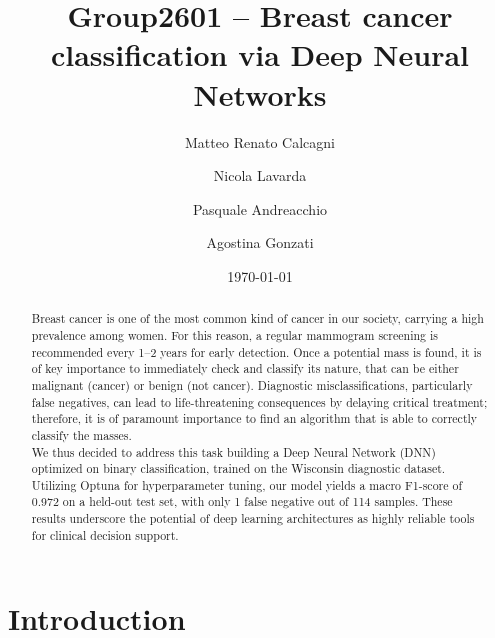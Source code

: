 \documentclass[prl,twocolumn]{revtex4-2}
\begin{document}
\title{Group2601 -- Breast cancer classification via Deep Neural Networks}

\author{Matteo Renato Calcagni}
\author{Nicola Lavarda}
\author{Pasquale Andreacchio}
\author{Agostina Gonzati}

\date{\today}


\begin{abstract}
Breast cancer is one of the most common kind of cancer in our society, carrying a high prevalence among women. For this reason, a regular mammogram screening is recommended every 1--2 years for early detection. 
Once a potential mass is found, it is of key importance to immediately check and classify its nature, that can be either malignant (cancer) or benign (not cancer). Diagnostic misclassifications, particularly false negatives, can lead to life-threatening consequences by delaying critical treatment; therefore, it is of paramount importance to find an algorithm that is able to correctly classify the masses. \\
We thus decided to address this task building a Deep Neural Network (DNN) optimized on binary classification, trained on the Wisconsin diagnostic dataset. Utilizing Optuna for hyperparameter tuning, our model yields a macro F1-score of 0.972 on a held-out test set, with only 1 false negative out of 114 samples. These results underscore the potential of deep learning architectures as highly reliable tools for clinical decision support.
\end{abstract}


\maketitle

\section{Introduction}
\end{document}

